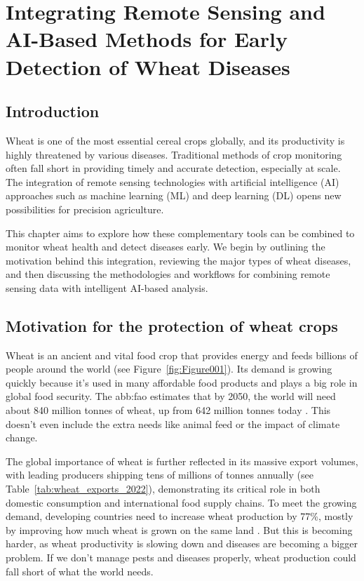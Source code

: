 \chapter{Integrating Remote Sensing and AI-Based Methods for Early Detection of Wheat Diseases}

\section{Introduction}
Wheat is one of the most essential cereal crops globally, and its productivity is highly threatened by various diseases. Traditional methods of crop monitoring often fall short in providing timely and accurate detection, especially at scale. The integration of remote sensing technologies with artificial intelligence (AI) approaches such as machine learning (ML) and deep learning (DL) opens new possibilities for precision agriculture.

This chapter aims to explore how these complementary tools can be combined to monitor wheat health and detect diseases early. We begin by outlining the motivation behind this integration, reviewing the major types of wheat diseases, and then discussing the methodologies and workflows for combining remote sensing data with intelligent AI-based analysis.




\section{Motivation for the protection of wheat crops}

Wheat is an ancient and vital food crop that provides energy and feeds billions of people around the world (see Figure~\ref{fig:Figure001}). Its demand is growing quickly because it’s used in many affordable food products and plays a big role in global food security. The \gls{abb:fao} estimates that by 2050, the world will need about 840 million tonnes of wheat, up from 642 million tonnes today \parencite{sharma2015wheat}. This doesn’t even include the extra needs like animal feed or the impact of climate change.

The global importance of wheat is further reflected in its massive export volumes, with leading producers shipping tens of millions of tonnes annually (see Table~\ref{tab:wheat_exports_2022}), demonstrating its critical role in both domestic consumption and international food supply chains. To meet the growing demand, developing countries need to increase wheat production by 77\%, mostly by improving how much wheat is grown on the same land \parencite{sharma2015wheat}. But this is becoming harder, as wheat productivity is slowing down and diseases are becoming a bigger problem. If we don’t manage pests and diseases properly, wheat production could fall short of what the world needs.

